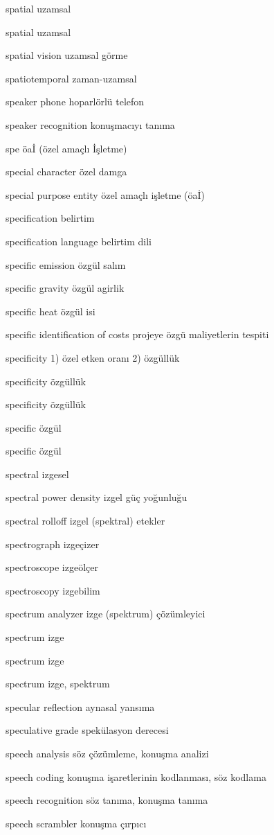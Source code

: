 \documentclass[12pt,fleqn]{article}\usepackage{../../common}
\begin{document}
spatial uzamsal

spatial uzamsal

spatial vision uzamsal görme

spatiotemporal zaman-uzamsal

speaker phone hoparlörlü telefon

speaker recognition konuşmacıyı tanıma

spe öaİ (özel amaçlı İşletme)

special character özel damga

special purpose entity özel amaçlı işletme (öaİ)

specification belirtim

specification language belirtim dili

specific emission özgül salım

specific gravity özgül agirlik

specific heat özgül isi

specific identification of costs projeye özgü maliyetlerin tespiti

specificity 1) özel etken oranı 2) özgüllük

specificity özgüllük

specificity özgüllük

specific özgül

specific özgül

spectral izgesel

spectral power density izgel güç yoğunluğu

spectral rolloff izgel (spektral) etekler

spectrograph izgeçizer

spectroscope izgeölçer

spectroscopy izgebilim

spectrum analyzer izge (spektrum) çözümleyici

spectrum izge

spectrum izge

spectrum izge, spektrum

specular reflection aynasal yansıma

speculative grade spekülasyon derecesi

speech analysis söz çözümleme, konuşma analizi

speech coding konuşma işaretlerinin kodlanması, söz kodlama

speech recognition söz tanıma, konuşma tanıma

speech scrambler konuşma çırpıcı
\end{document}
